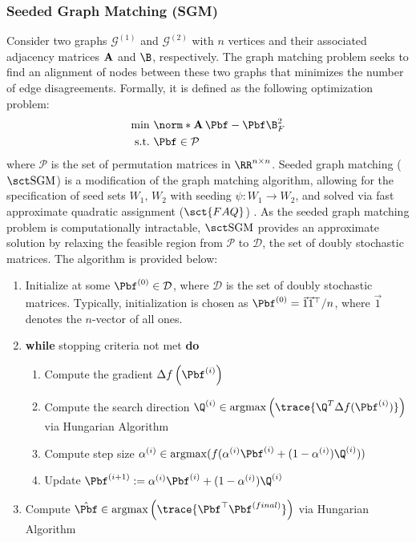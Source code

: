 \subsubsection{Seeded Graph Matching (SGM)} \label{sec:sgm}
Consider two graphs $\mathcal{G}^{(1)}$ and  $\mathcal{G}^{(2)}$ with $n$ vertices and their associated adjacency matrices $\operatorname{\mathbf{A}}$ and $\B$, respectively. The graph matching problem seeks to find an alignment of nodes between these two graphs that minimizes the number of edge disagreements. Formally, it is defined as the following optimization problem:
\begin{align}
    \min & %
    ~\norm*{\A\Pbf - \Pbf\B}_F^2
    \label{eq:GMP}\\
    \mbox{s.t.} & {~\Pbf  \in \mathcal{P}} \nonumber
\end{align}
where $\mathcal{P}$ is the set of permutation matrices in $\RR^{n \times n}$.
Seeded graph matching ($\sgm$) is a modification of the graph matching algorithm, allowing for the specification of seed sets $W_1$, $W_2$ with seeding $\psi : W_1 \rightarrow W_2$, and solved via fast approximate quadratic assignment ($\sct{FAQ}$) \cite{vogelstein2015fast}.
As the seeded graph matching problem is computationally intractable, $\sgm$ provides an approximate solution by relaxing the feasible region from $\mathcal{P}$ to $\mathcal{D}$, the set of doubly stochastic matrices. The algorithm is provided below:
\begin{enumerate}
    \item Initialize at some $\Pbf^{(0)} \in \mathcal{D}$, where $\mathcal{D}$ is the set of doubly stochastic matrices. Typically, initialization is chosen as $\Pbf^{(0)} = \vec{1}\vec{1}^\top / n$, where $\vec{1}$ denotes the $n$-vector of all ones.
    \item \textbf{while} stopping criteria not met \textbf{do}
        \begin{enumerate}
            \item Compute the gradient $\Delta f\left(\Pbf^{(i)}\right)$
            \item Compute the search direction $\Q^{(i)} \in \argmax{\left(\trace{\Q^{T} \Delta f(\Pbf^{\left(i\right)})}\right)}$ via Hungarian Algorithm
            \item  Compute step size $\alpha^{(i)} \in \argmax(f(\alpha^{(i)} \Pbf^{(i)} + (1 - \alpha^{(i)}) \Q^{(i)})) $
            \item Update $\Pbf^{(i+1)} := \alpha^{(i)} \Pbf^{(i)} + (1 - \alpha^{(i)}) \Q^{(i)}$
        \end{enumerate}
    \item Compute $\hat{\Pbf} \in \argmax\left(\trace{\Pbf^{\top} \Pbf^{(final)}}\right)$ via Hungarian Algorithm
\end{enumerate} 
